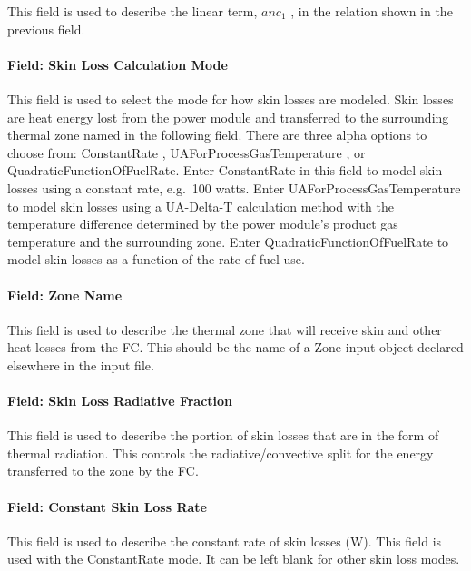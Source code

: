This field is used to describe the linear term, \(an{c_1}\) , in the relation shown in the previous field.

\paragraph{Field: Skin Loss Calculation Mode}\label{field-skin-loss-calculation-mode}

This field is used to select the mode for how skin losses are modeled. Skin losses are heat energy lost from the power module and transferred to the surrounding thermal zone named in the following field. There are three alpha options to choose from: ConstantRate , UAForProcessGasTemperature , or QuadraticFunctionOfFuelRate. Enter ConstantRate in this field to model skin losses using a constant rate, e.g.~100 watts. Enter UAForProcessGasTemperature to model skin losses using a UA-Delta-T calculation method with the temperature difference determined by the power module's product gas temperature and the surrounding zone. Enter QuadraticFunctionOfFuelRate to model skin losses as a function of the rate of fuel use.

\paragraph{Field: Zone Name}\label{field-zone-name-8-000}

This field is used to describe the thermal zone that will receive skin and other heat losses from the FC. This should be the name of a Zone input object declared elsewhere in the input file.

\paragraph{Field: Skin Loss Radiative Fraction}\label{field-skin-loss-radiative-fraction-1}

This field is used to describe the portion of skin losses that are in the form of thermal radiation. This controls the radiative/convective split for the energy transferred to the zone by the FC.

\paragraph{Field: Constant Skin Loss Rate}\label{field-constant-skin-loss-rate}

This field is used to describe the constant rate of skin losses (W). This field is used with the ConstantRate mode. It can be left blank for other skin loss modes.

